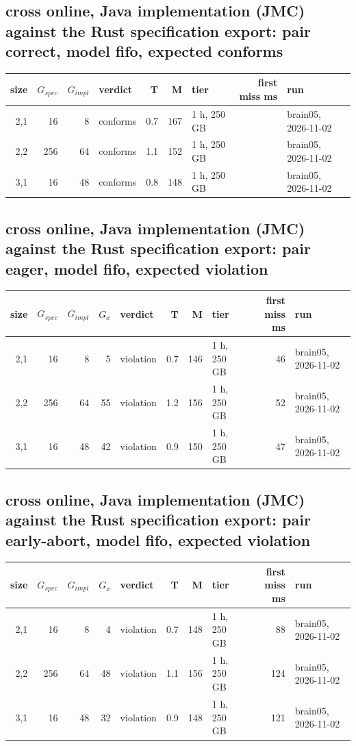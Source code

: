 \documentclass[10pt]{article}
\begin{document}
\subsection*{cross online, Java implementation (JMC) against the Rust specification export: pair \textsf{correct}, model fifo, expected conforms}
\begin{longtable}{@{}rrrlrrlrl@{}}
\toprule
size & $G_{\mathit{spec}}$ & $G_{\mathit{impl}}$ & verdict & T & M & tier & first miss ms & run \\
\midrule
\endhead
\color{red} 2,1 & 16 & 8 & conforms & 0.7 & 167 & 1 h, 250 GB &  & brain05, 2026-11-02 \\
\color{red} 2,2 & 256 & 64 & conforms & 1.1 & 152 & 1 h, 250 GB &  & brain05, 2026-11-02 \\
\color{red} 3,1 & 16 & 48 & conforms & 0.8 & 148 & 1 h, 250 GB &  & brain05, 2026-11-02 \\
\bottomrule
\end{longtable}
\subsection*{cross online, Java implementation (JMC) against the Rust specification export: pair \textsf{eager}, model fifo, expected violation}
\begin{longtable}{@{}rrrrlrrlrl@{}}
\toprule
size & $G_{\mathit{spec}}$ & $G_{\mathit{impl}}$ & $G_x$ & verdict & T & M & tier & first miss ms & run \\
\midrule
\endhead
\color{red} 2,1 & 16 & 8 & 5 & violation & 0.7 & 146 & 1 h, 250 GB & 46 & brain05, 2026-11-02 \\
\color{red} 2,2 & 256 & 64 & 55 & violation & 1.2 & 156 & 1 h, 250 GB & 52 & brain05, 2026-11-02 \\
\color{red} 3,1 & 16 & 48 & 42 & violation & 0.9 & 150 & 1 h, 250 GB & 47 & brain05, 2026-11-02 \\
\bottomrule
\end{longtable}
\subsection*{cross online, Java implementation (JMC) against the Rust specification export: pair \textsf{early-abort}, model fifo, expected violation}
\begin{longtable}{@{}rrrrlrrlrl@{}}
\toprule
size & $G_{\mathit{spec}}$ & $G_{\mathit{impl}}$ & $G_x$ & verdict & T & M & tier & first miss ms & run \\
\midrule
\endhead
\color{red} 2,1 & 16 & 8 & 4 & violation & 0.7 & 148 & 1 h, 250 GB & 88 & brain05, 2026-11-02 \\
\color{red} 2,2 & 256 & 64 & 48 & violation & 1.1 & 156 & 1 h, 250 GB & 124 & brain05, 2026-11-02 \\
\color{red} 3,1 & 16 & 48 & 32 & violation & 0.9 & 148 & 1 h, 250 GB & 121 & brain05, 2026-11-02 \\
\bottomrule
\end{longtable}
\end{document}
